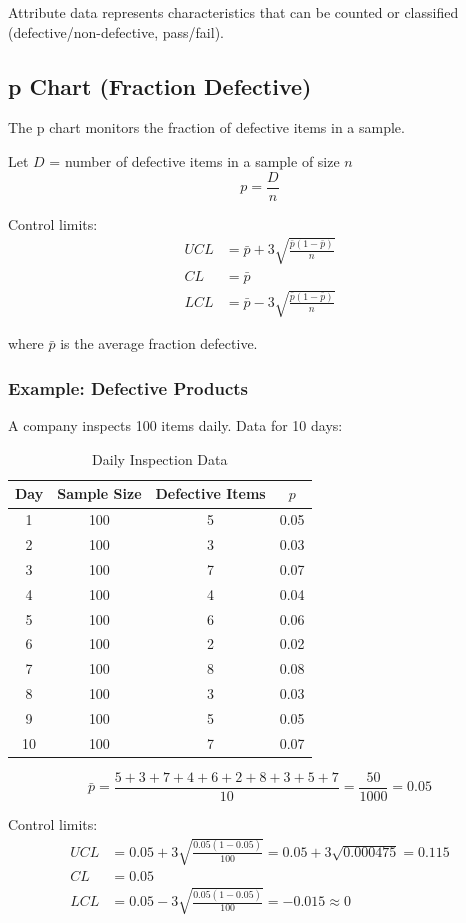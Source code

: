 \documentclass[twoside]{book}
\begin{document}
Attribute data represents characteristics that can be counted or classified (defective/non-defective, pass/fail).

\subsection{p Chart (Fraction Defective)}

The p chart monitors the fraction of defective items in a sample.

Let $D$ = number of defective items in a sample of size $n$
$$p = \frac{D}{n}$$

Control limits:
\begin{align}
UCL &= \bar{p} + 3\sqrt{\frac{\bar{p}(1-\bar{p})}{n}}\\
CL &= \bar{p}\\
LCL &= \bar{p} - 3\sqrt{\frac{\bar{p}(1-\bar{p})}{n}}
\end{align}

where $\bar{p}$ is the average fraction defective.

\subsubsection{Example: Defective Products}

A company inspects 100 items daily. Data for 10 days:

\begin{table}[H]
\centering
\caption{Daily Inspection Data}
\begin{tabular}{cccc}
\toprule
Day & Sample Size & Defective Items & $p$ \\
\midrule
1 & 100 & 5 & 0.05 \\
2 & 100 & 3 & 0.03 \\
3 & 100 & 7 & 0.07 \\
4 & 100 & 4 & 0.04 \\
5 & 100 & 6 & 0.06 \\
6 & 100 & 2 & 0.02 \\
7 & 100 & 8 & 0.08 \\
8 & 100 & 3 & 0.03 \\
9 & 100 & 5 & 0.05 \\
10 & 100 & 7 & 0.07 \\
\bottomrule
\end{tabular}
\end{table}

$$\bar{p} = \frac{5+3+7+4+6+2+8+3+5+7}{10} = \frac{50}{1000} = 0.05$$

Control limits:
\begin{align}
UCL &= 0.05 + 3\sqrt{\frac{0.05(1-0.05)}{100}} = 0.05 + 3\sqrt{0.000475} = 0.115\\
CL &= 0.05\\
LCL &= 0.05 - 3\sqrt{\frac{0.05(1-0.05)}{100}} = -0.015 \approx 0
\end{align}
\end{document}
